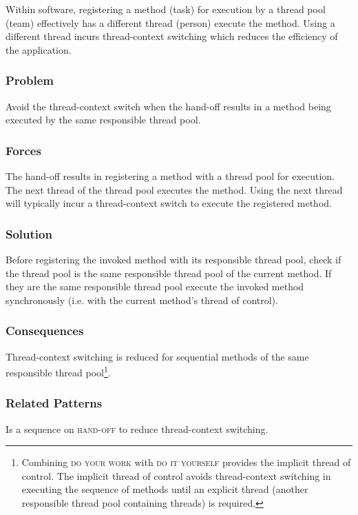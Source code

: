 \documentclass[prodmode]{style/acmlarge}
\begin{document}
Within software, registering a method (task) for execution by a thread pool
(team) effectively has a different thread (person) execute the method.  Using a
different thread incurs thread-context switching which reduces the efficiency of
the application.

\subsubsection*{\textbf{Problem}} Avoid the thread-context switch when the hand-off
results in a method being executed by the same responsible thread pool.

\subsubsection*{Forces} The hand-off results in registering a method with a
thread pool for execution.  The next thread of the thread pool executes the
method.  Using the next thread will typically incur a thread-context switch to
execute the registered method.

\subsubsection*{\textbf{Solution}} Before registering the invoked method with its
responsible thread pool, check if the thread pool is the same responsible thread
pool of the current method.  If they are the same responsible thread pool
execute the invoked method synchronously (i.e. with the current method's thread
of control).

\subsubsection*{Consequences} Thread-context switching is reduced for sequential
methods of the same responsible thread pool\footnote{Combining \textsc{do your
work} with \textsc{do it yourself} provides the implicit thread of control.  The
implicit thread of control avoids thread-context switching in executing the
sequence of methods until an explicit thread (another responsible thread pool
containing threads) is required.}.

\subsubsection*{Related Patterns} Is a sequence on \textsc{hand-off} to reduce
thread-context switching.
\end{document}
